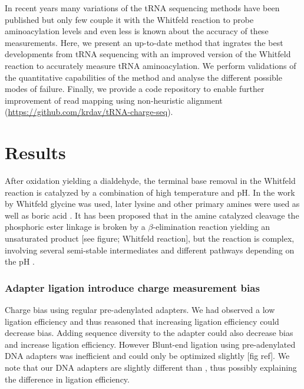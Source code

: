 \documentclass[9pt,lineno]{elife}
\begin{document}
In recent years many variations of the tRNA sequencing methods have been published \citep{Wang2021-fc, Zheng2015-kj, Shigematsu2017-tv, Erber2020-qg, Thomas2021-fi, Lucas2023-vm, Pinkard2020-yd, Warren2021-wt, Yamagami2022-yb} but only few couple it with the Whitfeld reaction to probe aminoacylation levels \citep{Evans2017-st, Behrens2021-gb, Watkins2022-er} and even less is known about the accuracy of these measurements.
Here, we present an up-to-date method that ingrates the best developments from tRNA sequencing with an improved version of the Whitfeld reaction to accurately measure tRNA aminoacylation.
We perform validations of the quantitative capabilities of the method and analyse the different possible modes of failure.
Finally, we provide a code repository to enable further improvement of read mapping using non-heuristic alignment (\url{https://github.com/krdav/tRNA-charge-seq}).



\section{Results}


After oxidation yielding a dialdehyde, the terminal base removal in the Whitfeld reaction is catalyzed by a combination of high temperature and pH.
In the work by Whitfeld \citep{Whitfeld1954-wl} glycine was used, later lysine and other primary amines were used \citep{Khym1961-xf} as well as boric acid \citep{randerath1973sequence}.
It has been proposed that in the amine catalyzed cleavage the phosphoric ester linkage is broken by a $\beta$-elimination reaction \citep{Rammler1971-mt, uziel1973periodate} yielding an unsaturated product [see figure; Whitfeld reaction], but the reaction is complex, involving several semi-stable intermediates and different pathways depending on the pH \citep{Uziel1975-ja}.



\subsubsection{Adapter ligation introduce charge measurement bias}
Charge bias using regular pre-adenylated adapters.
We had observed a low ligation efficiency and thus reasoned that increasing ligation efficiency could decrease bias.
Adding sequence diversity to the adapter could also decrease bias and increase ligation efficiency.
However
Blunt-end ligation using pre-adenylated DNA adapters was inefficient and could only be optimized slightly [fig ref].
We note that our DNA adapters are slightly different than \cite{Behrens2021-gb}, thus possibly explaining the difference in ligation efficiency.
\end{document}

